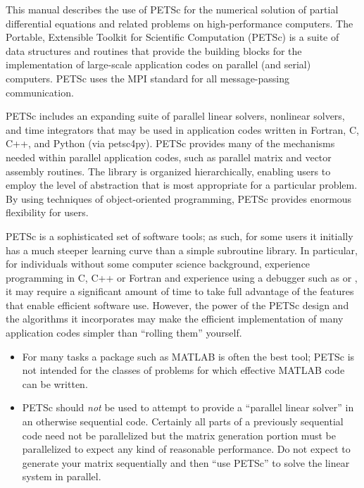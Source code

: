 
%
%

\medskip \medskip
This manual describes the use of PETSc for the numerical solution
of partial differential equations and related problems
on high-performance computers.  The
Portable, Extensible Toolkit for Scientific Computation (PETSc) is a
suite of data structures and routines that provide the building
blocks for the implementation of large-scale application codes on parallel
(and serial) computers.  PETSc uses the MPI standard for all
message-passing communication.

PETSc includes an expanding suite of parallel linear solvers, nonlinear
solvers, and time integrators that may be
used in application codes written in Fortran, C, C++, and Python (via petsc4py).  PETSc
provides many of the mechanisms needed within parallel application
codes, such as parallel matrix and vector assembly routines. The library is
organized hierarchically, enabling users to employ the level of
abstraction that is most appropriate for a particular problem. By
using techniques of object-oriented programming, PETSc provides
enormous flexibility for users.

PETSc is a sophisticated set of software tools; as such, for some
users it initially has a much steeper learning curve than a simple
subroutine library. In particular, for individuals without some
computer science background, experience programming in C, C++ or Fortran and experience using a debugger such as  or , it
may require a significant amount of time to take full advantage of the
features that enable efficient software use.  However, the power of
the PETSc design and the algorithms it incorporates may make the efficient
implementation of many application codes simpler than ``rolling
them'' yourself.
\begin{itemize}
\item  For many tasks a package such as MATLAB is often the best tool; PETSc is not
intended for the classes of problems for which effective MATLAB code
can be written.
\item PETSc should {\em not} be used to attempt to provide
a ``parallel linear solver'' in an otherwise sequential code.
Certainly all parts of a previously sequential code need not be parallelized but the
matrix generation portion must be parallelized to expect any kind of reasonable performance.
Do not expect to generate your matrix sequentially and then ``use PETSc'' to solve
the linear system in parallel.
\end{itemize}

